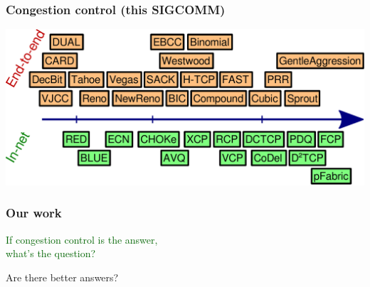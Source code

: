 \documentclass[svgnames]{beamer}
\begin{document}
\begin{frame}
\frametitle{Congestion control (this SIGCOMM)}
\noindent \hspace{-.75 cm} \includegraphics[width=1.1\textwidth]{march.pdf}
\end{frame}

%

\begin{frame}

\frametitle{Our work}

\begin{centering}

\LARGE \textcolor{DarkGreen}{If congestion control is the answer,\\what's the question?}

\vspace{\baselineskip}

\pause

\LARGE \textcolor{NavyBlue}{Are there better answers?}

\end{centering}

\end{frame}
\end{document}
